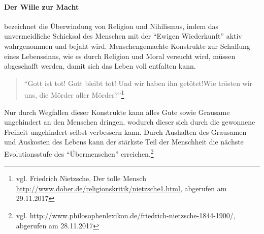\paragraph{Der Wille zur Macht} bezeichnet die Überwindung von Religion und Nihilismus, indem das unvermeidliche Schicksal des Menschen mit der \enquote{Ewigen Wiederkunft} aktiv wahrgenommen und bejaht wird.
Menschengemachte Konstrukte zur Schaffung eines Lebenssinns, wie es durch Religion und Moral versucht wird, müssen abgeschafft werden, damit sich das Leben voll entfalten kann.
\begin{quote}
\enquote{Gott ist tot! Gott bleibt tot! Und wir haben ihn getötet!Wie trösten wir uns, die Mörder aller Mörder?}\footnote{vgl. Friedrich Nietzsche, Der tolle Mensch \url{http://www.dober.de/religionskritik/nietzsche1.html}, abgerufen am 29.11.2017}
\end{quote}
Nur durch Wegfallen dieser Konstrukte kann alles Gute sowie Grausame ungehindert an den Menschen dringen, wodurch dieser sich durch die gewonnene Freiheit ungehindert selbst verbessern kann.
Durch Aushalten des Grausamen und Auskosten des Lebens kann der stärkste Teil der Menschheit die nächste Evolutionsstufe des \enquote{Übermenschen} erreichen.\footnote{vgl. \url{http://www.philosophenlexikon.de/friedrich-nietzsche-1844-1900/}, abgerufen am 28.11.2017}

